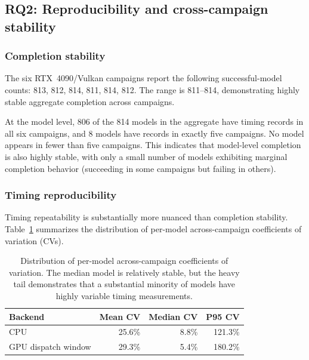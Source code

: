 \documentclass[10pt,twocolumn]{article}
\begin{document}
\subsection{RQ2: Reproducibility and cross-campaign stability}\label{sec:rq2}

\subsubsection{Completion stability}

The six RTX~4090/Vulkan campaigns report the following successful-model counts: 813, 812, 814, 811, 814, 812. The range is 811--814, demonstrating highly stable aggregate completion across campaigns.

At the model level, 806 of the 814 models in the aggregate have timing records in all six campaigns, and 8 models have records in exactly five campaigns. No model appears in fewer than five campaigns. This indicates that model-level completion is also highly stable, with only a small number of models exhibiting marginal completion behavior (succeeding in some campaigns but failing in others).

\subsubsection{Timing reproducibility}

Timing repeatability is substantially more nuanced than completion stability. Table~\ref{tab:reproducibility} summarizes the distribution of per-model across-campaign coefficients of variation (CVs).

\begin{table}[t]
\centering\scriptsize
\setlength{\tabcolsep}{2pt}
\begin{tabular}{@{}lrrr@{}}
\toprule
Backend & Mean CV & Median CV & P95 CV \\
\midrule
CPU & 25.6\% & 8.8\% & 121.3\% \\
GPU dispatch window & 29.3\% & 5.4\% & 180.2\% \\
\bottomrule
\end{tabular}
\caption{Distribution of per-model across-campaign coefficients of variation. The median model is relatively stable, but the heavy tail demonstrates that a substantial minority of models have highly variable timing measurements.}
\label{tab:reproducibility}
\end{table}
\end{document}

